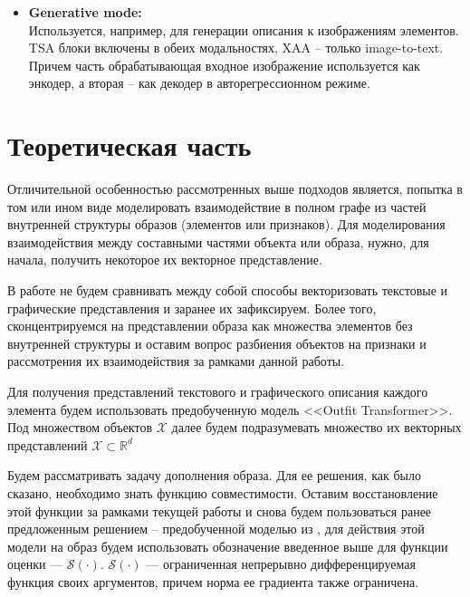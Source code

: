 \documentclass[a4paper,14pt]{extarticle}
\begin{document}
\begin{itemize}
					\item[]\textbf{Generative mode:}\\
					Используется, например, для генерации описания к изображениям элементов. TSA блоки включены в обеих модальностях, XAA -- только image-to-text. Причем часть обрабатывающая входное изображение используется как энкодер, а вторая -- как декодер в авторегрессионном режиме.
				\end{itemize}
			
		\section{Теоретическая часть}
				Отличительной особенностью рассмотренных выше подходов является, попытка в том или ином виде моделировать взаимодействие в полном графе из частей внутренней структуры образов (элементов или признаков). Для моделирования взаимодействия между составными частями объекта или образа, нужно, для начала, получить некоторое их векторное представление. 
				
				В работе не будем сравнивать между собой способы векторизовать текстовые и графические представления и заранее их зафиксируем. Более того, сконцентрируемся на представлении образа как множества элементов без внутренней структуры и оставим вопрос разбиения объектов на признаки и рассмотрения их взаимодействия за рамками данной работы.
								
				Для получения представлений текстового и графического описания каждого элемента будем использовать предобученную модель <<Outfit Transformer>>\cite{https://doi.org/10.48550/arXiv.2204.04812}. Под множеством объектов $\mathcal{X}$ далее будем подразумевать множество их векторных представлений $\mathcal{X}\subset \mathbb{R}^d$
				
				Будем рассматривать задачу дополнения образа. Для ее решения, как было сказано, необходимо знать функцию совместимости. Оставим восстановление этой функции за рамками текущей работы и снова будем пользоваться ранее предложенным решением -- предобученной моделью из \cite{https://doi.org/10.48550/arXiv.2204.04812}, для действия этой модели на образ будем использовать обозначение введенное выше для функции оценки --- $\mathcal{S}(\cdot)$. 
				$\mathcal{S}(\cdot)$ --- ограниченная непрерывно дифференцируемая функция своих аргументов, причем норма ее градиента также ограничена. 
				
\end{document}
